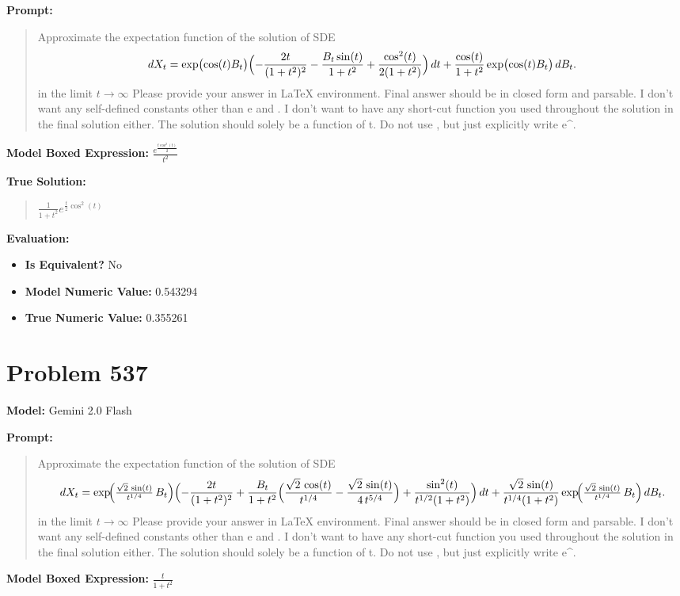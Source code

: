 \documentclass{article}
\begin{document}
\textbf{Prompt:}
\begin{quote}
Approximate the expectation function of the solution of SDE $$dX_t=\exp\bigl(\cos(t)B_t\bigr)\Bigl(-\frac{2t}{(1+t^2)^2}-\frac{B_t\sin(t)}{1+t^2}+\frac{\cos^2(t)}{2(1+t^2)}\Bigr)\,dt+\frac{\cos(t)}{1+t^2}\exp\bigl(\cos(t)B_t\bigr)\,dB_t.$$ in the limit $t \to \infty$ Please provide your answer in LaTeX \boxed{} environment. Final answer should be in closed form and parsable. I don't want any self-defined constants other than e and \pi. I don't want to have any short-cut function you used throughout the solution in the final solution either. The solution should solely be a function of t. Do not use \exp, but just explicitly write e^.
\end{quote}
\textbf{Model Boxed Expression:} $\frac{e^{\frac{t \cos^2(t)}{2}}}{t^2}$

\textbf{True Solution:}
\begin{quote}
$\frac{1}{1 + t^2} e^{\frac{t}{2}\cos^2(t)}$
\end{quote}

\textbf{Evaluation:}
\begin{itemize}
\item \textbf{Is Equivalent?} No
\item \textbf{Model Numeric Value:} 0.543294
\item \textbf{True Numeric Value:} 0.355261
\end{itemize}
\vspace{1cm}
\section*{Problem 537}
\textbf{Model:} Gemini 2.0 Flash

\textbf{Prompt:}
\begin{quote}
Approximate the expectation function of the solution of SDE $$dX_t =\exp\!\Bigl(\tfrac{\sqrt2\,\sin(t)}{t^{1/4}}\,B_t\Bigr)\Bigl(-\frac{2t}{(1+t^2)^2}+\frac{B_t}{1+t^2}\Bigl(\frac{\sqrt2\,\cos(t)}{t^{1/4}}-\frac{\sqrt2\,\sin(t)}{4\,t^{5/4}}\Bigr)+\frac{\sin^2(t)}{t^{1/2}(1+t^2)}\Bigr)\,dt+\frac{\sqrt2\,\sin(t)}{t^{1/4}(1+t^2)}\exp\!\Bigl(\tfrac{\sqrt2\,\sin(t)}{t^{1/4}}\,B_t\Bigr)\,dB_t.$$ in the limit $t \to \infty$ Please provide your answer in LaTeX \boxed{} environment. Final answer should be in closed form and parsable. I don't want any self-defined constants other than e and \pi. I don't want to have any short-cut function you used throughout the solution in the final solution either. The solution should solely be a function of t. Do not use \exp, but just explicitly write e^.
\end{quote}
\textbf{Model Boxed Expression:} $\frac{t}{1+t^2}$
\end{document}
